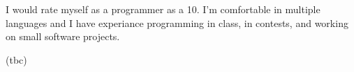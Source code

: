 I would rate myself as a programmer as a 10. I'm comfortable in multiple languages and I have experiance programming in class, in contests, and working on small software projects.

(tbc)
